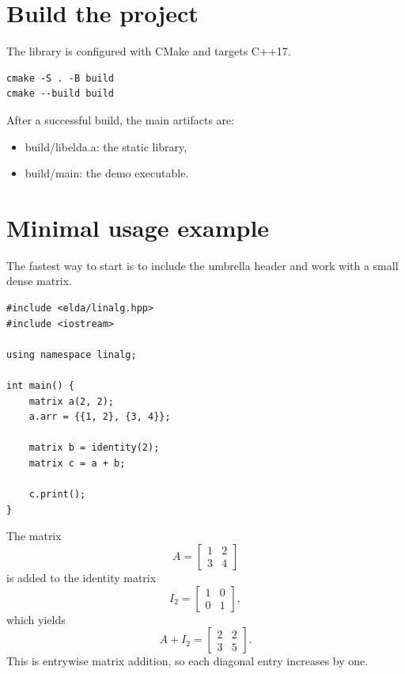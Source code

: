 \documentclass[11pt,a4paper,openany]{book}
\def\code#1{#1}%
\DeclareRobustCommand{\code}[1]{\texttt{\detokenize{#1}}}
\begin{document}
\section{Build the project}
The library is configured with CMake and targets C++17.

\begin{lstlisting}[style=eldaCpp,caption={Build commands}]
cmake -S . -B build
cmake --build build
\end{lstlisting}

After a successful build, the main artifacts are:
\begin{itemize}
    \item \code{build/libelda.a}: the static library,
    \item \code{build/main}: the demo executable.
\end{itemize}

\section{Minimal usage example}
The fastest way to start is to include the umbrella header and work with a small dense matrix.

\begin{lstlisting}[style=eldaCpp,caption={Minimal ELDA program}]
#include <elda/linalg.hpp>
#include <iostream>

using namespace linalg;

int main() {
    matrix a(2, 2);
    a.arr = {{1, 2}, {3, 4}};

    matrix b = identity(2);
    matrix c = a + b;

    c.print();
}
\end{lstlisting}

\begin{examplebox}
The matrix
\[
A = \begin{bmatrix}
1 & 2 \\
3 & 4
\end{bmatrix}
\]
is added to the identity matrix
\[
I_2 = \begin{bmatrix}
1 & 0 \\
0 & 1
\end{bmatrix},
\]
which yields
\[
A + I_2 =
\begin{bmatrix}
2 & 2 \\
3 & 5
\end{bmatrix}.
\]
This is entrywise matrix addition, so each diagonal entry increases by one.
\end{examplebox}
\end{document}
